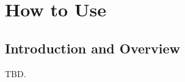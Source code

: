 \chapter{How to Use \emph{\productbasenameshort{}}}
\label{cuuc0}


\section{Introduction and Overview}
\label{cuuc0:siov0}

TBD.


